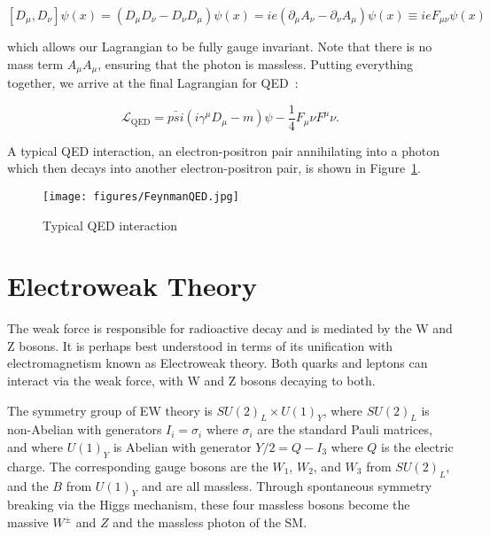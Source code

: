 \begin{equation}
\left[D_{\mu}, D_{\nu}\right]\psi(x) = \left(D_{\mu}D_{\nu} - D_{\nu}D_{\mu}\right)\psi(x)
= ie\left(\partial_{\mu}A_{\nu} - \partial_{\nu}A_{\mu}\right)\psi(x) \equiv ieF_{\mu\nu}\psi(x)
\end{equation}

\noindent which allows our Lagrangian to be fully gauge invariant. Note that there is no mass term $A_{\mu}A_{\mu}$, ensuring that the photon is massless. Putting everything together, we arrive at the final Lagrangian for QED~\cite{halzen}:

\begin{equation}
\mathcal{L}_{\text{QED}} = \bar{psi}\left(i\gamma^{\mu}D_{\mu} - m\right)\psi - \frac{1}{4}F_{\mu}{\nu}F^{\mu}{\nu}.
\end{equation} 

\noindent A typical QED interaction, an electron-positron pair annihilating into a photon which then decays into another electron-positron pair, is shown in Figure~\ref{fig:FeynmanQED}.

\begin{figure}
\centering
  \texttt{[image: figures/FeynmanQED.jpg]}
  \caption{\label{fig:FeynmanQED} Typical QED interaction\cite{QEDFeynman}}
\end{figure}


\section{Electroweak Theory}
\label{sec:EW}

The weak force is responsible for radioactive decay and is mediated by the W and Z bosons. It is perhaps best understood in terms of its unification with electromagnetism known as Electroweak theory. Both quarks and leptons can interact via the weak force, with W and Z bosons decaying to both. 

The symmetry group of EW theory is $SU(2)_{L} \times U(1)_{Y}$, where $SU(2)_{L}$ is non-Abelian with generators $I_{i} = \sigma_{i}$ where $\sigma_{i}$ are the standard Pauli matrices, and where $U(1)_{Y}$ is Abelian with generator $Y/2 = Q - I_{3}$ where $Q$ is the electric charge. The corresponding gauge bosons are the $W_{1}$, $W_{2}$, and $W_{3}$ from $SU(2)_{L}$, and the $B$ from $U(1)_{Y}$ and are all massless. Through spontaneous symmetry breaking via the Higgs mechanism, these four massless bosons become the massive $W^{\pm}$ and $Z$ and the massless photon of the SM.

